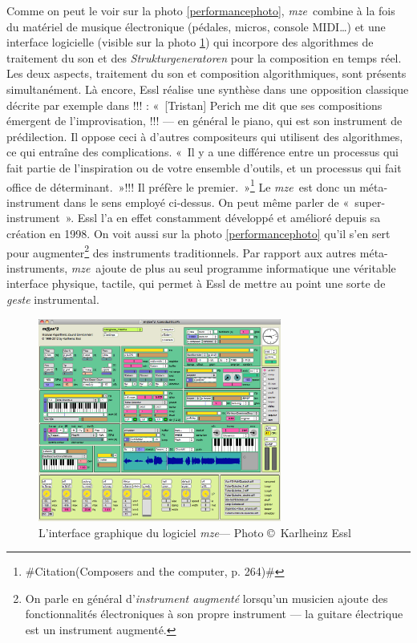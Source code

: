 \documentclass[a4paper,12pt]{article}
\newcommand{\guill}[1]{«~#1~»}
\newcommand{\zitat}[2]{\#Citation(#2)\#}
\newcommand{\maze}[0]{\emph{m\symbol{64}ze\textdegree2}}
\begin{document}
Comme on peut le voir sur la photo \ref{performancephoto}, \maze~combine à la fois du matériel de musique électronique (pédales, micros, console MIDI\dots) et une interface logicielle (visible sur la photo \ref{mazephoto}) qui incorpore des algorithmes de traitement du son et des \emph{Strukturgeneratoren} pour la composition en temps réel. Les deux aspects, traitement du son et composition algorithmiques, sont présents simultanément. Là encore, Essl réalise une synthèse dans une opposition classique décrite par exemple dans !!! : \guill{[Tristan] Perich me dit que ses compositions émergent de l'improvisation, !!! --- en général le piano, qui est son instrument de prédilection. Il oppose ceci à d'autres compositeurs qui utilisent des algorithmes, ce qui entraîne des complications. \guill{Il y a une différence entre un processus qui fait partie de l'inspiration ou de votre ensemble d'outils, et un processus qui fait office de déterminant.}!!! Il préfère le premier.}\footnote{\zitat{[Tristan] Perich tells me that his compositions spring from improvisation, the mind at play --- usually at the piano, which is his main instrument. He constrats this with other composers who use algorithms, which introduce complications. \guill{There's a difference between process being part of the inspiration or the tool set that you have, and process being a determinant.} He prefers the former.}
{Composers and the computer, p. 264}}
Le \maze~est donc un méta-instrument dans le sens employé ci-dessus. On peut même parler de \guill{super-instrument}. Essl l'a en effet constamment développé et amélioré depuis sa création en 1998. On voit aussi sur la photo \ref{performancephoto} qu'il s'en sert pour augmenter\footnote{On parle en général d'\emph{instrument augmenté} lorsqu'un musicien ajoute des fonctionnalités électroniques à son propre instrument --- la guitare électrique est un instrument augmenté.} des instruments traditionnels. Par rapport aux autres méta-instruments, \maze~ajoute de plus au seul programme informatique une véritable interface physique, tactile, qui permet à Essl de mettre au point une sorte de \emph{geste} instrumental.

\begin{figure}[h!]
\begin{center}
\includegraphics[width=8cm]{images/maze.png}
\caption{\footnotesize L'interface graphique du logiciel \maze --- Photo \copyright~Karlheinz Essl}
\label{mazephoto}
\end{center}
\end{figure}
\end{document}
